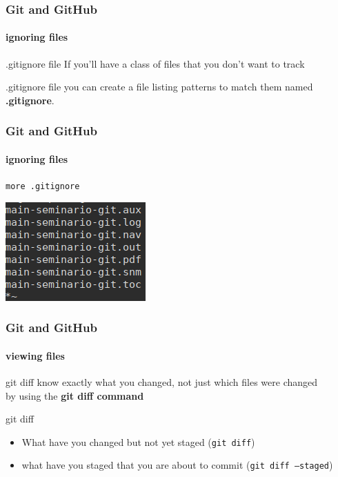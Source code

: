 \begin{frame}
	\frametitle{Git and GitHub}
    \framesubtitle{ignoring files}
    \addtocounter{nframe}{1}


	\begin{block}{.gitignore file}
		If you’ll have a class of files that you don’t want to track
	\end{block}

	\begin{block}{.gitignore file}
		you can create a file listing patterns to match them named \textbf{.gitignore}.
	\end{block}

\end{frame}

\begin{frame}
	\frametitle{Git and GitHub}
    \framesubtitle{ignoring files}
    \addtocounter{nframe}{1}

	\begin{center}
		\texttt{more .gitignore}
	\end{center}
	
	\begin{center}
		\includegraphics[width=.8\textwidth]{imgs/gitignore.png}
	\end{center}

\end{frame}

\begin{frame}
	\frametitle{Git and GitHub}
    \framesubtitle{viewing files}
    \addtocounter{nframe}{1}

	\begin{block}{git diff}
		know exactly what you changed, not just which files were changed\\
		by using the \textbf{git diff command}
	\end{block}

	\begin{block}{git diff}
		\begin{itemize}
			\item What have you changed but not yet staged (\texttt{git diff})
			\item what have you staged that you are about to commit (\texttt{git diff --staged})
		\end{itemize}
	
	\end{block}

\end{frame}

